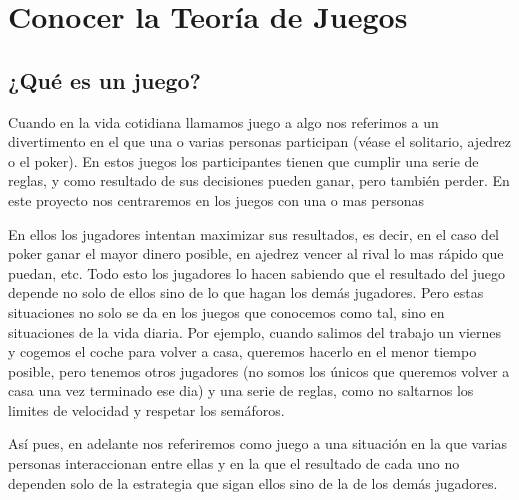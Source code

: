 \documentclass[12pt,a4paper,]{book}
\def\ifdoblecara{} %
\def\ifprincipal{} %
\numberwithin{dummy}{section}
\theoremstyle{ocrenumbox}
\theoremstyle{blacknumex}
\theoremstyle{blacknumbox}
\theoremstyle{ocrenum}
\theoremstyle{ocrenum}
\begin{document}
\renewcommand{\headrulewidth}{0.4pt}
\renewcommand{\footrulewidth}{0.4pt}

\ifdefined\ifprincipal
\else
\setlength{\parindent}{1em}
\pagestyle{fancy}
\setcounter{tocdepth}{4}
\tableofcontents

\fi

\ifdefined\ifdoblecara
\fancyhead{}{}
\fancyhead[LE,RO]{\scriptsize\rightmark}
\fancyfoot[LO,RE]{\scriptsize\slshape \leftmark}
\fancyfoot[C]{}
\fancyfoot[LE,RO]{\footnotesize\thepage}
\else
\fancyhead{}{}
\fancyhead[RO]{\scriptsize\rightmark}
\fancyfoot[LO]{\scriptsize\slshape \leftmark}
\fancyfoot[C]{}
\fancyfoot[RO]{\footnotesize\thepage}
\fi

\renewcommand{\headrulewidth}{0.4pt}
\renewcommand{\footrulewidth}{0.4pt}

\hypertarget{Seccion1}{%
\chapter{Conocer la Teoría de Juegos}\label{Seccion1}}

\hypertarget{Seccion11}{%
\section{¿Qué es un juego?}\label{Seccion11}}

Cuando en la vida cotidiana llamamos juego a algo nos referimos a un
divertimento en el que una o varias personas participan (véase el
solitario, ajedrez o el poker). En estos juegos los participantes tienen
que cumplir una serie de reglas, y como resultado de sus decisiones
pueden ganar, pero también perder. En este proyecto nos centraremos en
los juegos con una o mas personas

En ellos los jugadores intentan maximizar sus resultados, es decir, en
el caso del poker ganar el mayor dinero posible, en ajedrez vencer al
rival lo mas rápido que puedan, etc. Todo esto los jugadores lo hacen
sabiendo que el resultado del juego depende no solo de ellos sino de lo
que hagan los demás jugadores. Pero estas situaciones no solo se da en
los juegos que conocemos como tal, sino en situaciones de la vida
diaria. Por ejemplo, cuando salimos del trabajo un viernes y cogemos el
coche para volver a casa, queremos hacerlo en el menor tiempo posible,
pero tenemos otros jugadores (no somos los únicos que queremos volver a
casa una vez terminado ese dia) y una serie de reglas, como no saltarnos
los limites de velocidad y respetar los semáforos.

Así pues, en adelante nos referiremos como juego a una situación en la
que varias personas interaccionan entre ellas y en la que el resultado
de cada uno no dependen solo de la estrategia que sigan ellos sino de la
de los demás jugadores.
\end{document}
